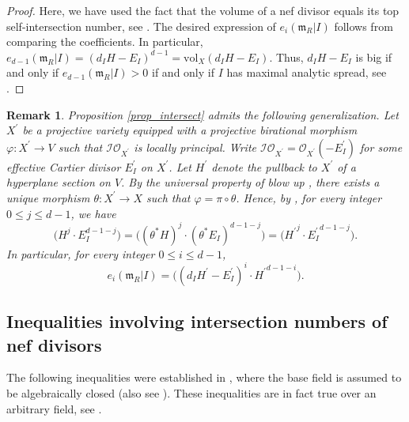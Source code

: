 \documentclass[12pt,a4paper]{amsart}
\theoremstyle{plain}
\newtheorem{remark}[theorem]{Remark}
\theoremstyle{definition}
\numberwithin{equation}{theorem}
\begin{document}
\begin{proof}
Here, we have used the fact that the volume of a nef divisor equals its top self-intersection number, see \cite[Corollary 1.4.41]{Laz04a}. The desired expression of $e_i(\mathfrak{m}_R\vert I)$ follows from comparing the coefficients. In particular, $e_{d-1}\left(\mathfrak{m}_R \vert I\right) = \left(d_IH-E_I\right)^{d-1} = \mathrm{vol}_X\left(d_IH-E_I\right)$. Thus, $d_IH-E_I$ is big if and only if $e_{d-1}\left(\mathfrak{m}_R \vert I\right)>0$ if and only if $I$ has maximal analytic spread, see \cite[Corollary 3.6 and Corollary 3.7]{Tru01}.
\end{proof}

\begin{remark}\label{rem_intersect}
Proposition \ref{prop_intersect} admits the following generalization. Let $X^{\prime}$ be a projective variety equipped with a projective birational morphism $\varphi \colon X^{\prime} \to V$ such that $\mathcal{I}\mathcal{O}_{X^{\prime}}$ is locally principal. Write $\mathcal{I}\mathcal{O}_{X^{\prime}} = \mathcal{O}_{X^{\prime}}(-E_I^{\prime})$ for some effective Cartier divisor $E_I^{\prime}$ on $X^{\prime}$. Let $H^{\prime}$ denote the pullback to $X^{\prime}$ of a hyperplane section on $V$. By the universal property of blow up \cite[Proposition 7.14]{Har77}, there exists a unique morphism $\theta \colon X^{\prime} \to X$ such that $\varphi = \pi \circ \theta$. Hence, by \cite[Chapter I, Proposition 6]{Kle66}, for every integer $0\leq j\leq d-1$, we have $$\big(H^{j}\cdot E_I^{d-1-j}\big) = \big((\theta^*H)^{j}\cdot (\theta^*E_I)^{d-1-j}\big) = \big({H^\prime}^{j}\cdot {E_I^{\prime}}^{d-1-j}\big).$$ In particular, for every integer $0\leq i\leq d-1$, $$e_i\left(\mathfrak{m}_R \vert I\right) = \big((d_IH^{\prime}-E_I^{\prime})^{i}\cdot {H^{\prime}}^{d-1-i}\big).$$
\end{remark}

\subsection{Inequalities involving intersection numbers of nef divisors}

The following inequalities were established in \cite[Corollary 1.6.3 and Example 1.6.4]{Laz04a}, where the base field is assumed to be algebraically closed (also see \cite[Lemma 33]{Huh12}). These inequalities are in fact true over an arbitrary field, see \cite[Corollary 6.3]{Cut15}.
\end{document}
